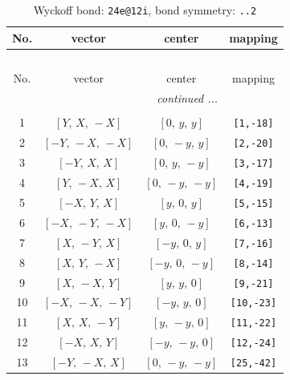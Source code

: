 \documentclass[fleqn,8pt]{jsarticle}
\begin{document}
\begin{longtable}{cccc}
\caption{Wyckoff bond: {\tt 24e@12i}, bond symmetry: {\tt ..2}}
 \\
 \hline \hline
No. & vector & center & mapping \\ \hline \endfirsthead

\multicolumn{3}{l}{\tablename\ \thetable{}} \\
 \hline \hline
No. & vector & center & mapping \\ \hline \endhead

 \hline \hline
\multicolumn{3}{r}{\footnotesize\it continued ...} \\ \endfoot

 \hline \hline
\multicolumn{3}{r}{} \\ \endlastfoot

1 & $\left[ Y,\, X,\, - X \right]$ & $\left[ 0,\, y,\, y \right]$ & {\tt [1,-18]} \\ \hline
2 & $\left[ - Y,\, - X,\, - X \right]$ & $\left[ 0,\, - y,\, y \right]$ & {\tt [2,-20]} \\ \hline
3 & $\left[ - Y,\, X,\, X \right]$ & $\left[ 0,\, y,\, - y \right]$ & {\tt [3,-17]} \\ \hline
4 & $\left[ Y,\, - X,\, X \right]$ & $\left[ 0,\, - y,\, - y \right]$ & {\tt [4,-19]} \\ \hline
5 & $\left[ - X,\, Y,\, X \right]$ & $\left[ y,\, 0,\, y \right]$ & {\tt [5,-15]} \\ \hline
6 & $\left[ - X,\, - Y,\, - X \right]$ & $\left[ y,\, 0,\, - y \right]$ & {\tt [6,-13]} \\ \hline
7 & $\left[ X,\, - Y,\, X \right]$ & $\left[ - y,\, 0,\, y \right]$ & {\tt [7,-16]} \\ \hline
8 & $\left[ X,\, Y,\, - X \right]$ & $\left[ - y,\, 0,\, - y \right]$ & {\tt [8,-14]} \\ \hline
9 & $\left[ X,\, - X,\, Y \right]$ & $\left[ y,\, y,\, 0 \right]$ & {\tt [9,-21]} \\ \hline
10 & $\left[ - X,\, - X,\, - Y \right]$ & $\left[ - y,\, y,\, 0 \right]$ & {\tt [10,-23]} \\ \hline
11 & $\left[ X,\, X,\, - Y \right]$ & $\left[ y,\, - y,\, 0 \right]$ & {\tt [11,-22]} \\ \hline
12 & $\left[ - X,\, X,\, Y \right]$ & $\left[ - y,\, - y,\, 0 \right]$ & {\tt [12,-24]} \\ \hline
13 & $\left[ - Y,\, - X,\, X \right]$ & $\left[ 0,\, - y,\, - y \right]$ & {\tt [25,-42]} \\ \hline

\end{longtable}
\end{document}

